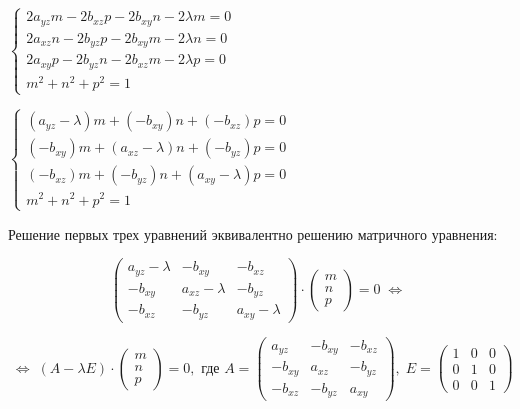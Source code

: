 \documentclass[article,final,14pt]{scrreprt}
\begin{document}
\begin{center}
	$\begin{cases}
		2 a_{yz} m - 2 b_{xz} p - 2 b_{xy} n - 2 \lambda m = 0 \\
		2 a_{xz} n - 2 b_{yz} p - 2 b_{xy} m - 2 \lambda n = 0 \\
		2 a_{xy} p - 2 b_{yz} n - 2 b_{xz} m - 2 \lambda p = 0 \\
		m^2 + n^2 + p^2 = 1
	\end{cases}$
\end{center}

\begin{center}
	$\begin{cases}
		(a_{yz} - \lambda ) m + (-b_{xy}) n + (-b_{xz}) p = 0 \\
		(-b_{xy})m + (a_{xz} - \lambda)n + (-b_{yz})p = 0 \\
		(-b_{xz})m + (-b_{yz})n + (a_{xy} - \lambda)p = 0 \\ 
		m^2 + n^2 + p^2 = 1
	\end{cases}$
\end{center}

Решение первых трех уравнений эквивалентно решению матричного уравнения:

$$\begin{pmatrix}
	a_{yz} - \lambda & -b_{xy} & -b_{xz} \\
	-b_{xy} & a_{xz} - \lambda & -b_{yz} \\
	-b_{xz} & -b_{yz} & a_{xy} - \lambda
\end{pmatrix}\cdot \begin{pmatrix}
	m \\ n \\ p
\end{pmatrix} = 0 \; \Leftrightarrow \; $$

$$\; \Leftrightarrow \; (A - \lambda E)\cdot \begin{pmatrix}
	m \\ n \\ p
\end{pmatrix} = 0,\text{ где } A = \begin{pmatrix}
	a_{yz}  & -b_{xy} & -b_{xz} \\
	-b_{xy} & a_{xz} & -b_{yz} \\
	-b_{xz} & -b_{yz} & a_{xy}
\end{pmatrix}, \; E = \begin{pmatrix}
	1 & 0 & 0 \\
	0 & 1 & 0 \\
	0 & 0 & 1
\end{pmatrix}$$
\end{document}
